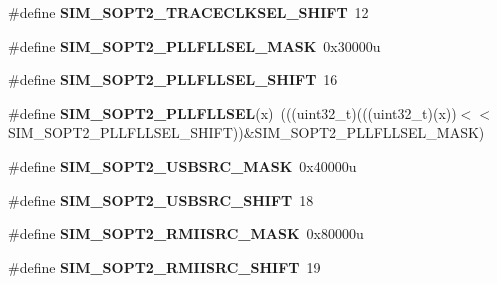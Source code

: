 \begin{DoxyCompactItemize}
\item 
\#define {\bfseries S\+I\+M\+\_\+\+S\+O\+P\+T2\+\_\+\+T\+R\+A\+C\+E\+C\+L\+K\+S\+E\+L\+\_\+\+S\+H\+I\+FT}~12\hypertarget{group__SIM__Register__Masks_ga6ce7d361b38ac28e6976c71569fe672b}{}\label{group__SIM__Register__Masks_ga6ce7d361b38ac28e6976c71569fe672b}

\item 
\#define {\bfseries S\+I\+M\+\_\+\+S\+O\+P\+T2\+\_\+\+P\+L\+L\+F\+L\+L\+S\+E\+L\+\_\+\+M\+A\+SK}~0x30000u\hypertarget{group__SIM__Register__Masks_gaa14141a225f9778babacbf3b90d0bae2}{}\label{group__SIM__Register__Masks_gaa14141a225f9778babacbf3b90d0bae2}

\item 
\#define {\bfseries S\+I\+M\+\_\+\+S\+O\+P\+T2\+\_\+\+P\+L\+L\+F\+L\+L\+S\+E\+L\+\_\+\+S\+H\+I\+FT}~16\hypertarget{group__SIM__Register__Masks_gae98b4d574b65472bdb294092d4ce5b4a}{}\label{group__SIM__Register__Masks_gae98b4d574b65472bdb294092d4ce5b4a}

\item 
\#define {\bfseries S\+I\+M\+\_\+\+S\+O\+P\+T2\+\_\+\+P\+L\+L\+F\+L\+L\+S\+EL}(x)~(((uint32\+\_\+t)(((uint32\+\_\+t)(x))$<$$<$S\+I\+M\+\_\+\+S\+O\+P\+T2\+\_\+\+P\+L\+L\+F\+L\+L\+S\+E\+L\+\_\+\+S\+H\+I\+FT))\&S\+I\+M\+\_\+\+S\+O\+P\+T2\+\_\+\+P\+L\+L\+F\+L\+L\+S\+E\+L\+\_\+\+M\+A\+SK)\hypertarget{group__SIM__Register__Masks_ga8d44d4d4557fe51bf7b212dd91af91ab}{}\label{group__SIM__Register__Masks_ga8d44d4d4557fe51bf7b212dd91af91ab}

\item 
\#define {\bfseries S\+I\+M\+\_\+\+S\+O\+P\+T2\+\_\+\+U\+S\+B\+S\+R\+C\+\_\+\+M\+A\+SK}~0x40000u\hypertarget{group__SIM__Register__Masks_ga1caf7ffe2555eb59ed410110b6aba463}{}\label{group__SIM__Register__Masks_ga1caf7ffe2555eb59ed410110b6aba463}

\item 
\#define {\bfseries S\+I\+M\+\_\+\+S\+O\+P\+T2\+\_\+\+U\+S\+B\+S\+R\+C\+\_\+\+S\+H\+I\+FT}~18\hypertarget{group__SIM__Register__Masks_ga2a455b7e86f26185c92961e139d13a89}{}\label{group__SIM__Register__Masks_ga2a455b7e86f26185c92961e139d13a89}

\item 
\#define {\bfseries S\+I\+M\+\_\+\+S\+O\+P\+T2\+\_\+\+R\+M\+I\+I\+S\+R\+C\+\_\+\+M\+A\+SK}~0x80000u\hypertarget{group__SIM__Register__Masks_ga9262e104be6bd6949b9c75eee32840da}{}\label{group__SIM__Register__Masks_ga9262e104be6bd6949b9c75eee32840da}

\item 
\#define {\bfseries S\+I\+M\+\_\+\+S\+O\+P\+T2\+\_\+\+R\+M\+I\+I\+S\+R\+C\+\_\+\+S\+H\+I\+FT}~19\hypertarget{group__SIM__Register__Masks_ga53ce396f3ed312e00b1d31bb456b0707}{}\label{group__SIM__Register__Masks_ga53ce396f3ed312e00b1d31bb456b0707}


\end{DoxyCompactItemize}
